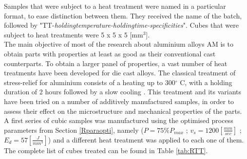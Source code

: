Samples that were subject to a heat treatment were named in a particular format, to ease distinction between them. They received the name of the batch, followed by "TT-\textit{holdingtemperature-holdingtime-specificities}". Cubes that were subject to heat treatments were 5 x 5 x 5 [mm$^3$].\\


The main objective of most of the research about aluminium alloys AM is to obtain parts with properties at least as good as their conventional cast counterparts. To obtain a larger panel of properties, a vast number of heat treatments have been developed for die cast alloys. The classical treatment of stress-relief for aluminium consists of a heating up to 300$^\circ$ C, with a holding duration of 2 hours followed by a slow cooling \cite{Mertens170406}. This treatment and its variants have been tried on a number of additively manufactured samples, in order to assess their effect on the microstructure and mechanical properties of the parts.\\

A first series of cubic samples was manufactured using the optimised process parameters from Section \ref{Rparaopti}, namely ($P=75\% P_{max}$ ; $v_s=1200 [\frac{mm}{sec}]$ ; $E_d=57 [\frac{J}{mm^3}]$) and a different heat treatment was applied to each one of them. The complete list of cubes treated can be found in Table \ref{tab:RTT}.\\

